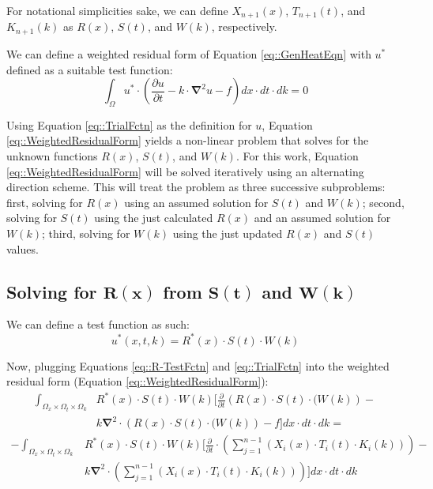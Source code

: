 \documentclass{article}
\def\ds{\displaystyle}
\def\pd{\partial}
\def\grad{\mathbf\nabla}
\begin{document}
For notational simplicities sake, we can define $X_{n+1}(x)$, $T_{n+1}(t)$, and $K_{n+1}(k)$ as $R(x)$, $S(t)$, and $W(k)$, respectively.

We can define a weighted residual form of Equation \ref{eq::GenHeatEqn} with $u^*$ defined as a suitable test function:
\begin{equation}
\label{eq::WeightedResidualForm}
\ds\int_{\Omega} u^* \cdot\left(\frac{\pd u}{\pd t} -k\cdot\grad^2 u -f \right) dx \cdot dt \cdot dk = 0
\end{equation}

Using Equation \ref{eq::TrialFctn} as the definition for $u$, Equation \ref{eq::WeightedResidualForm} yields a non-linear problem that solves for the unknown functions $R(x)$, $S(t)$, and $W(k)$. For this work, Equation \ref{eq::WeightedResidualForm} will be solved iteratively using an alternating direction scheme. This will treat the problem as three successive subproblems: first, solving for $R(x)$ using an assumed solution for $S(t)$ and $W(k)$; second, solving for $S(t)$ using the just calculated $R(x)$ and an assumed solution for $W(k)$; third, solving for $W(k)$ using the just updated $R(x)$ and $S(t)$ values.

\subsection{Solving for $\mathbf{R(x)}$ from $\mathbf{S(t)}$ and $\mathbf{W(k)}$}
We can define a test function as such:
\begin{equation}
\label{eq::R-TestFctn}
u^*(x,t,k) = R^*(x) \cdot S(t) \cdot W(k)
\end{equation}

Now, plugging Equations \ref{eq::R-TestFctn} and \ref{eq::TrialFctn} into the weighted residual form (Equation \ref{eq::WeightedResidualForm}):
\begin{align*}
\ds\int_{\Omega_x \times \Omega_t \times \Omega_k} & R^*(x) \cdot S(t) \cdot W(k) \bigg[ \frac{\pd}{\pd t} \left( R(x) \cdot S(t) \cdot (W(k) \right) - \\
&  k\grad^2 \cdot \left( R(x) \cdot S(t) \cdot (W(k) \right) -f \bigg] dx \cdot dt \cdot dk =
\end{align*}
\begin{align}
\label{eq::R-1}
- \ds\int_{\Omega_x \times \Omega_t \times \Omega_k} & R^*(x) \cdot S(t) \cdot W(k) \Bigg[\frac{\pd}{\pd t} \cdot \left( \ds\sum_{j=1}^{n-1} \left(X_i(x) \cdot T_i(t) \cdot K_i(k)\right)\right) - \nonumber\\
&  k\grad^2 \cdot \left( \ds\sum_{j=1}^{n-1} \left(X_i(x) \cdot T_i(t) \cdot K_i(k)\right) \right)\Bigg] dx \cdot dt \cdot dk
\end{align}
\end{document}
